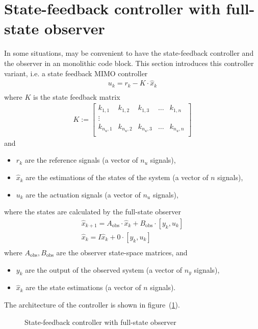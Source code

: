 \documentclass[12pt]{Template_}
\begin{document}
\section{State-feedback controller with full-state observer}
In some situations, may be convenient to have the state-feedback controller and the observer in an monolithic code block. This section introduces this controller variant,
i.e. a state feedback MIMO controller
\begin{eqnarray*}
 u_k = r_k - K\cdot \hat x_k \\
\end{eqnarray*}
where $K$ is the state feedback matrix
\[
\begin{array}{cccc}
 K:=\left[ \begin{array}{ccccc}
 k_{1,1} & k_{1,2} & k_{1,3} & \ldots & k_{1,n}\\
 \vdots\\
 k_{n_u,1} & k_{n_u,2} & k_{n_u,3} & \ldots &k_{n_u,n}\\
 \end{array}
 \right]
 \end{array}
\]
and 
\begin{itemize}
\item $r_k$ are the reference signals (a vector of $n_u$ signals),
\item $\hat x_k$ are the estimations of the states of the system (a vector of $n$ signals),
\item $u_k$ are the actuation signals (a vector of $n_u$ signals),
\end{itemize}
where the states are calculated by the full-state observer
\begin{eqnarray*}
 \hat{x}_{k+1} = A_\mathrm{obs}\cdot \hat{x}_{k} + B_\mathrm{obs}\cdot [y_k,u_k]\\
 \hat{x}_{k} = 	 I \hat{x}_{k} + 0\cdot [y_k,u_k]\\
\end{eqnarray*}
where $A_\mathrm{obs}, B_\mathrm{obs}$ are the observer state-space matrices, and
\begin{itemize}
\item $y_k$ are the output of the observed system (a vector of $n_y$ signals),
\item $\hat x_k$ are the state estimations (a vector of $n$ signals).
\end{itemize}
The architecture of the controller is shown in figure~(\ref{fig:sfb_ctr_w_full_obs}).
\begin{figure}[htb]
\begin{center}

\vspace{-3mm}
\caption{State-feedback controller with full-state observer}
\label{fig:sfb_ctr_w_full_obs}
\end{center}
\end{figure}
\end{document}
